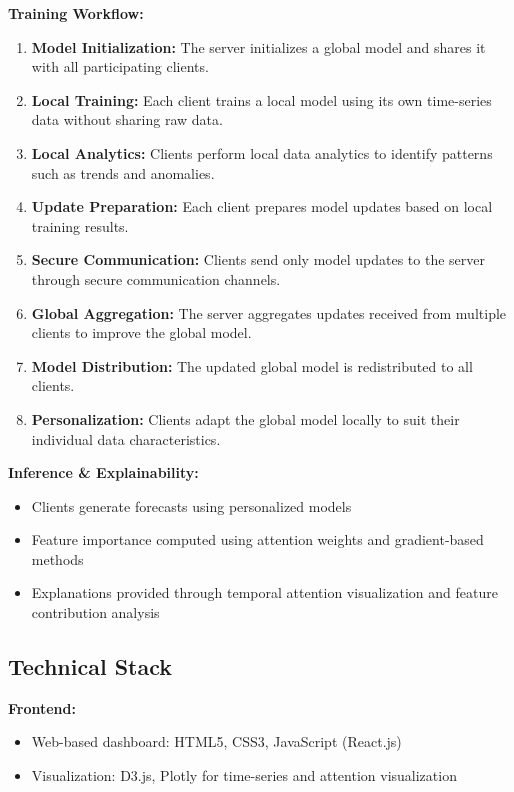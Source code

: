 \documentclass[11pt, a4paper]{article}
\begin{document}
\textbf{Training Workflow:}
\begin{enumerate}[noitemsep, topsep=0pt]
    \item \textbf{Model Initialization:} The server initializes a global model and shares it with all participating clients.
    \item \textbf{Local Training:} Each client trains a local model using its own time-series data without sharing raw data.
    \item \textbf{Local Analytics:} Clients perform local data analytics to identify patterns such as trends and anomalies.
    \item \textbf{Update Preparation:} Each client prepares model updates based on local training results.
    \item \textbf{Secure Communication:} Clients send only model updates to the server through secure communication channels.
    \item \textbf{Global Aggregation:} The server aggregates updates received from multiple clients to improve the global model.
    \item \textbf{Model Distribution:} The updated global model is redistributed to all clients.
    \item \textbf{Personalization:} Clients adapt the global model locally to suit their individual data characteristics.
\end{enumerate}

\textbf{Inference \& Explainability:}
\begin{itemize}[noitemsep, topsep=0pt]
    \item Clients generate forecasts using personalized models
    \item Feature importance computed using attention weights and gradient-based methods
    \item Explanations provided through temporal attention visualization and feature contribution analysis
\end{itemize}

\subsection{Technical Stack}

\textbf{Frontend:}
\begin{itemize}[noitemsep, topsep=0pt]
    \item Web-based dashboard: HTML5, CSS3, JavaScript (React.js)
    \item Visualization: D3.js, Plotly for time-series and attention visualization
\end{itemize}
\end{document}
